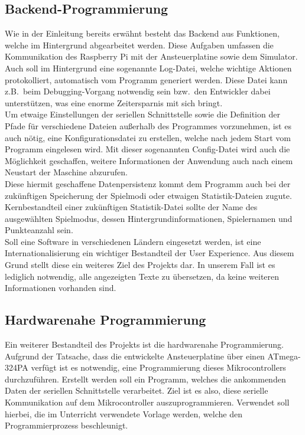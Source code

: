 \subsection{Backend-Programmierung}\label{subsec:backend-programmierung}
Wie in der Einleitung bereits erwähnt besteht das Backend aus Funktionen, welche im Hintergrund abgearbeitet werden.
Diese Aufgaben umfassen die Kommunikation des Raspberry Pi mit der Ansteuerplatine sowie dem Simulator.\\
Auch soll im Hintergrund eine sogenannte Log-Datei, welche wichtige Aktionen protokolliert, automatisch vom Programm generiert werden.
Diese Datei kann z.B.\ beim Debugging-Vorgang notwendig sein bzw.\ den Entwickler dabei unterstützen, was eine enorme Zeitersparnis mit sich bringt.\\
Um etwaige Einstellungen der seriellen Schnittstelle sowie die Definition der Pfade für verschiedene Dateien außerhalb des Programmes vorzunehmen, ist es auch nötig, eine Konfigurationsdatei zu erstellen, welche nach jedem Start vom Programm eingelesen wird.
Mit dieser sogenannten Config-Datei wird auch die Möglichkeit geschaffen, weitere Informationen der Anwendung auch nach einem Neustart der Maschine abzurufen.\\
Diese hiermit geschaffene Datenpersistenz kommt dem Programm auch bei der zukünftigen Speicherung der Spielmodi oder etwaigen Statistik-Dateien zugute.
Kernbestandteil einer zukünftigen Statistik-Datei sollte der Name des ausgewählten Spielmodus, dessen Hintergrundinformationen, Spielernamen und Punkteanzahl sein.\\
Soll eine Software in verschiedenen Ländern eingesetzt werden, ist eine Internationalisierung ein wichtiger Bestandteil der User Experience.
Aus diesem Grund stellt diese ein weiteres Ziel des Projekts dar.
In unserem Fall ist es lediglich notwendig, alle angezeigten Texte zu übersetzen, da keine weiteren Informationen vorhanden sind.

\subsection{Hardwarenahe Programmierung}\label{subsec:hardwarenahe-programmierung}
Ein weiterer Bestandteil des Projekts ist die hardwarenahe Programmierung.
Aufgrund der Tatsache, dass die entwickelte Ansteuerplatine über einen ATmega-324PA verfügt ist es notwendig, eine Programmierung dieses Mikrocontrollers durchzuführen.
Erstellt werden soll ein Programm, welches die ankommenden Daten der seriellen Schnittstelle verarbeitet.
Ziel ist es also, diese serielle Kommunikation auf dem Mikrocontroller auszuprogrammieren.
Verwendet soll hierbei, die im Unterricht verwendete Vorlage werden, welche den Programmierprozess beschleunigt.
\newpage
